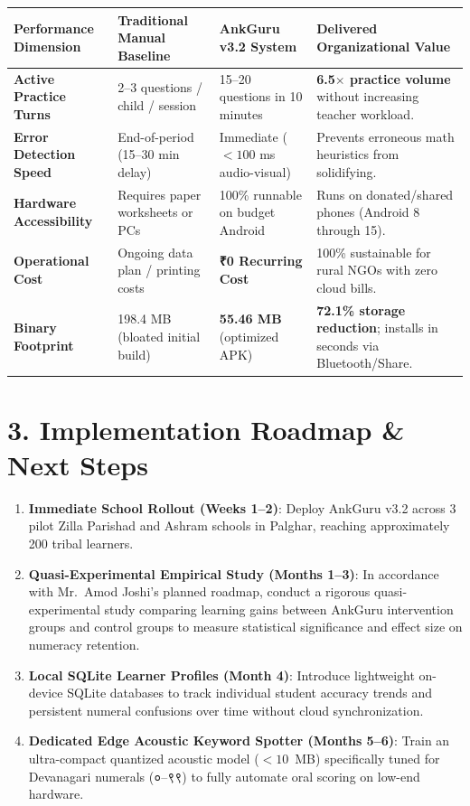\documentclass[10pt,a4paper]{article}
\begin{document}
\begin{table}[h!]
\centering
\scriptsize
\renewcommand{\arraystretch}{1.15}
\begin{tabularx}{\textwidth}{@{}p{3.0cm} p{3.4cm} p{3.5cm} X@{}}
\toprule
\rowcolor{primary!10}
\textbf{Performance Dimension} & \textbf{Traditional Manual Baseline} & \textbf{AnkGuru v3.2 System} & \textbf{Delivered Organizational Value} \\
\midrule
\textbf{Active Practice Turns} & 2--3 questions / child / session & 15--20 questions in 10 minutes & \textbf{6.5$\times$ practice volume} without increasing teacher workload. \\
\textbf{Error Detection Speed} & End-of-period (15--30 min delay) & Immediate ($<100$ ms audio-visual) & Prevents erroneous math heuristics from solidifying. \\
\textbf{Hardware Accessibility} & Requires paper worksheets or PCs & 100\% runnable on budget Android & Runs on donated/shared phones (Android 8 through 15). \\
\textbf{Operational Cost} & Ongoing data plan / printing costs & \textbf{₹0 Recurring Cost} & 100\% sustainable for rural NGOs with zero cloud bills. \\
\textbf{Binary Footprint} & 198.4 MB (bloated initial build) & \textbf{55.46 MB} (optimized APK) & \textbf{72.1\% storage reduction}; installs in seconds via Bluetooth/Share. \\
\bottomrule
\end{tabularx}
\end{table}

\vspace{-2pt}
\section*{3. Implementation Roadmap \& Next Steps}
\begin{enumerate}[itemsep=1.5pt]
    \item \textbf{Immediate School Rollout (Weeks 1--2)}: Deploy AnkGuru v3.2 across 3 pilot Zilla Parishad and Ashram schools in Palghar, reaching approximately 200 tribal learners.
    \item \textbf{Quasi-Experimental Empirical Study (Months 1--3)}: In accordance with Mr.~Amod Joshi's planned roadmap, conduct a rigorous quasi-experimental study comparing learning gains between AnkGuru intervention groups and control groups to measure statistical significance and effect size on numeracy retention.
    \item \textbf{Local SQLite Learner Profiles (Month 4)}: Introduce lightweight on-device SQLite databases to track individual student accuracy trends and persistent numeral confusions over time without cloud synchronization.
    \item \textbf{Dedicated Edge Acoustic Keyword Spotter (Months 5--6)}: Train an ultra-compact quantized acoustic model ($<10$~MB) specifically tuned for Devanagari numerals (०--९९) to fully automate oral scoring on low-end hardware.
\end{enumerate}
\end{document}
